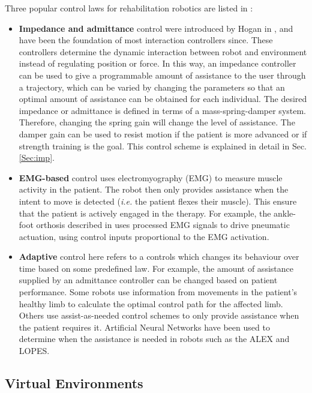 \documentclass[12pt]{report}
\begin{document}
	Three popular control laws for rehabilitation robotics are listed in \cite{Meng2015}:
	
\begin{itemize}

	\item \textbf{Impedance and admittance} control were introduced by Hogan in \cite{Hogan1985}, and have been the foundation of most interaction controllers since. These controllers determine the dynamic interaction between robot and environment instead of regulating position or force. In this way, an impedance controller can be used to give a programmable amount of assistance to the user through a trajectory, which can be varied by changing the parameters so that an optimal amount of assistance can be obtained for each individual. The desired impedance or admittance is defined in terms of a mass-spring-damper system. Therefore, changing the spring gain will change the level of assistance. The damper gain can be used to resist motion if the patient is more advanced or if strength training is the goal. This control scheme is explained in detail in Sec. \ref{Sec:imp}.
	
	\item \textbf{EMG-based} control uses electromyography (EMG) to measure muscle activity in the patient. The robot then only provides assistance when the intent to move is detected (\textit{i.e.} the patient flexes their muscle). This ensure that the patient is actively engaged in the therapy. For example, the ankle-foot orthosis described in \cite{Ferris2006} uses processed EMG signals to drive pneumatic actuation, using control inputs proportional to the EMG activation. 
	
	\item \textbf{Adaptive} control here refers to a controls which changes its behaviour over time based on some predefined law. For example, the amount of assistance supplied by an admittance controller can be changed based on patient performance. Some robots use information from movements in the patient's healthy limb to calculate the optimal control path for the affected limb. Others use assist-as-needed control schemes to only provide assistance when the patient requires it. Artificial Neural Networks have been used to determine when the assistance is needed in robots such as the ALEX and LOPES.
	
\end{itemize}
		
	\subsection{Virtual Environments} \label{Sec:VR}
	
\end{document}

